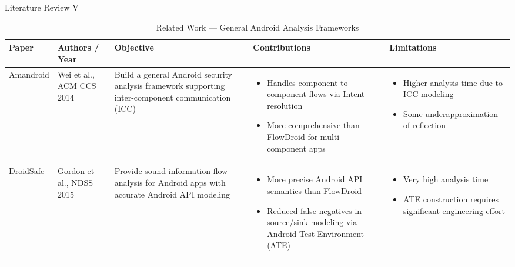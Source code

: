 \documentclass[aspectratio=169]{beamer}
\begin{document}
\begin{frame}{Literature Review V}
\begin{table}[ht]
    \centering
    \caption{Related Work — General Android Analysis Frameworks}
    \tiny
    \begin{tabular}{|p{0.6in}|p{0.65in}|p{1.0in}|p{1.3in}|p{1.3in}|}
    \hline
    \textbf{Paper} & \textbf{Authors / Year} & \textbf{Objective} &
    \textbf{Contributions} & \textbf{Limitations} \\
    \hline
    \vspace{1mm}
    Amandroid &
    Wei et al., ACM CCS 2014 &
    Build a general Android security analysis framework supporting inter-component communication (ICC) &
    \begin{itemize}
        \item Handles component-to-component flows via Intent resolution
        \item More comprehensive than FlowDroid for multi-component apps
    \end{itemize} &
    \begin{itemize}
        \item Higher analysis time due to ICC modeling
        \item Some underapproximation of reflection
    \end{itemize} \\
    \hline
    \vspace{1mm}
    DroidSafe &
    Gordon et al., NDSS 2015 &
    Provide sound information-flow analysis for Android apps with accurate Android API modeling &
    \begin{itemize}
        \item More precise Android API semantics than FlowDroid
        \item Reduced false negatives in source/sink modeling via Android Test Environment (ATE)
    \end{itemize} &
    \begin{itemize}
        \item Very high analysis time
        \item ATE construction requires significant engineering effort
    \end{itemize} \\
    \hline
    \end{tabular}
\end{table}
\end{frame}
\end{document}
